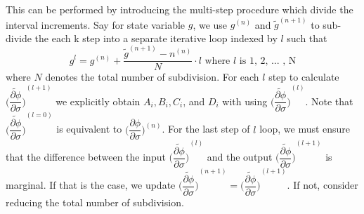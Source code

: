\documentclass[12pt]{amsart}
\begin{document}
This can be performed by introducing the multi-step procedure which divide the interval increments.
Say for state variable $g$, we use $g^{(n)}$ and $\tilde{g}^{(n+1)}$ to sub-divide the each k step into a separate iterative loop indexed by $l$ such that
\begin{equation}
  \label{eq:g_subdivision}
  g^{l}=g^{(n)}+\frac{\tilde{g}^{(n+1)}-n^{(n)}}{N}\cdot l \text{  where } l \text{ is 1, 2, ... , N}
\end{equation}
where $N$ denotes the total number of subdivision.
For each $l$ step to calculate $\tilde{\bigg(\dfrac{\partial\phi}{\partial\sigma}\bigg)}^{(l+1)}$ we explicitly obtain $A_i, B_i, C_i$, and $D_i$ with using $\tilde{\bigg(\dfrac{\partial\phi}{\partial\sigma}\bigg)}^{(l)}$.
Note that $\tilde{\bigg(\dfrac{\partial\phi}{\partial\sigma}\bigg)}^{(l=0)}$ is equivalent to $\bigg(\dfrac{\partial\phi}{\partial\sigma}\bigg)^{(n)}$.
For the last step of $l$ loop, we must ensure that the difference between the input $\tilde{\bigg(\dfrac{\partial\phi}{\partial\sigma}\bigg)}^{(l)}$ and the output $\tilde{\bigg(\dfrac{\partial\phi}{\partial\sigma}\bigg)}^{(l+1)}$ is marginal.
If that is the case, we update $\tilde{\bigg(\dfrac{\partial\phi}{\partial\sigma}\bigg)}^{(n+1)}=\tilde{\bigg(\dfrac{\partial\phi}{\partial\sigma}\bigg)}^{(l+1)}$.
If not, consider reducing the total number of subdivision.
\end{document}
